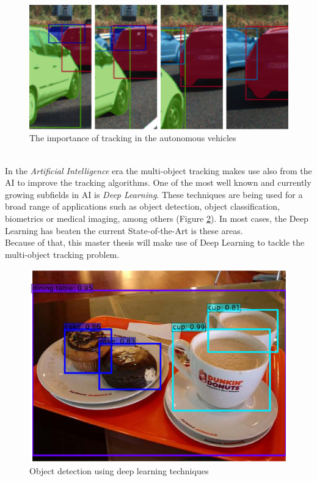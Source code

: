 \begin{figure}[h!]
\begin{center}
\includegraphics[scale=0.4]{figures/adas_tracking.png}
\caption{The importance of tracking in the autonomous vehicles \cite{voigtlaender2019mots}}
\label{fig:adas_tracking}
\end{center}
\end{figure}\\
In the \textit{Artificial Intelligence} era the multi-object tracking makes use also from the AI to improve the tracking algorithms. One of the most well known and currently growing subfields in AI is \textit{Deep Learning}. These techniques are being used for a broad range of applications such as object detection, object classification, biometrics or medical imaging, among others (Figure \ref{fig:ssd_detection}). In most cases, the Deep Learning has beaten the current State-of-the-Art is these areas.\\
Because of that, this master thesis will make use of Deep Learning to tackle the multi-object tracking problem.
\begin{figure}[H]
\begin{center}
\includegraphics[scale=0.35]{figures/ssd_detection.png}
\caption{Object detection using deep learning techniques \cite{liu2016ssd}}
\label{fig:ssd_detection}
\end{center}
\end{figure}

